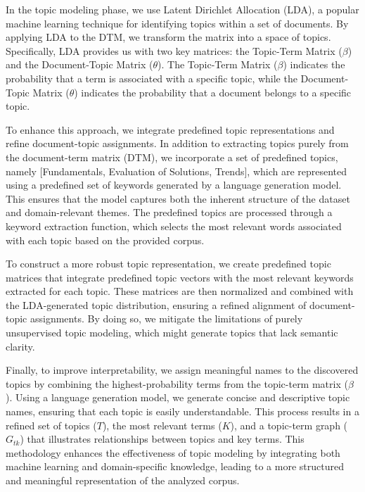 \documentclass[runningheads]{llncs}
\begin{document}
In the topic modeling phase, we use Latent Dirichlet Allocation (LDA), a popular machine learning technique for identifying topics within a set of documents. By applying LDA to the DTM, we transform the matrix into a space of topics. Specifically, LDA provides us with two key matrices: the Topic-Term Matrix ($\beta$) and the Document-Topic Matrix ($\theta$). The Topic-Term Matrix ($\beta$) indicates the probability that a term is associated with a specific topic, while the Document-Topic Matrix ($\theta$) indicates the probability that a document belongs to a specific topic.

To enhance this approach, we integrate predefined topic representations and refine document-topic assignments. In addition to extracting topics purely from the document-term matrix (DTM), we incorporate a set of predefined topics, namely [Fundamentals, Evaluation of Solutions, Trends], which are represented using a predefined set of keywords generated by a language generation model. This ensures that the model captures both the inherent structure of the dataset and domain-relevant themes. The predefined topics are processed through a keyword extraction function, which selects the most relevant words associated with each topic based on the provided corpus.

To construct a more robust topic representation, we create predefined topic matrices that integrate predefined topic vectors with the most relevant keywords extracted for each topic. These matrices are then normalized and combined with the LDA-generated topic distribution, ensuring a refined alignment of document-topic assignments. By doing so, we mitigate the limitations of purely unsupervised topic modeling, which might generate topics that lack semantic clarity.

Finally, to improve interpretability, we assign meaningful names to the discovered topics by combining the highest-probability terms from the topic-term matrix ($\beta$). Using a language generation model, we generate concise and descriptive topic names, ensuring that each topic is easily understandable. This process results in a refined set of topics ($T$), the most relevant terms ($K$), and a topic-term graph ($G_{tk}$) that illustrates relationships between topics and key terms. This methodology enhances the effectiveness of topic modeling by integrating both machine learning and domain-specific knowledge, leading to a more structured and meaningful representation of the analyzed corpus.
\end{document}
